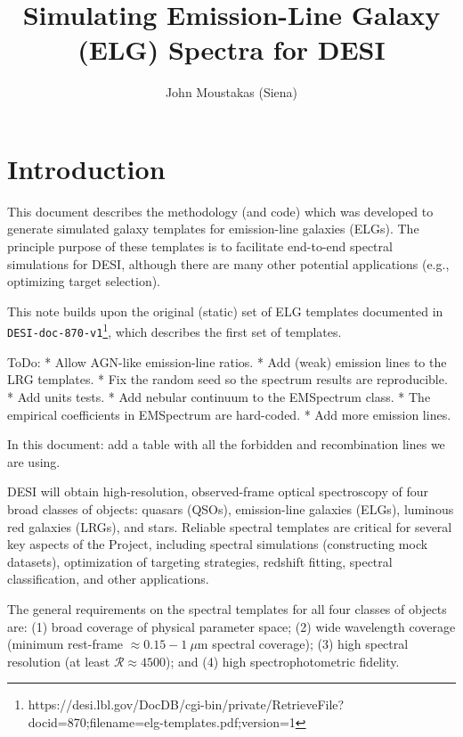 \documentclass[12pt]{article}
\begin{document}
\title{
  Simulating Emission-Line Galaxy (ELG) Spectra for DESI 
}

\author{John Moustakas (Siena)}
\maketitle


\section{Introduction}

This document describes the methodology (and code) which was developed
to generate simulated galaxy templates for emission-line galaxies
(ELGs).  The principle purpose of these templates is to facilitate
end-to-end spectral simulations for DESI, although there are many
other potential applications (e.g., optimizing target selection).

This note builds upon the original (static) set of ELG templates
documented in {\tt
  DESI-doc-870-v1}\footnote{https://desi.lbl.gov/DocDB/cgi-bin/private/RetrieveFile?docid=870;filename=elg-templates.pdf;version=1},
which describes the first set of templates.

ToDo:
* Allow AGN-like emission-line ratios.
* Add (weak) emission lines to the LRG templates.
* Fix the random seed so the spectrum results are reproducible.
* Add units tests.
* Add nebular continuum to the EMSpectrum class.
* The empirical coefficients in EMSpectrum are hard-coded.
* Add more emission lines.

In this document: add a table with all the forbidden and recombination lines we
are using.

DESI will obtain high-resolution, observed-frame optical spectroscopy
of four broad classes of objects: quasars (QSOs), emission-line
galaxies (ELGs), luminous red galaxies (LRGs), and stars.  Reliable
spectral templates are critical for several key aspects of the
Project, including spectral simulations (constructing mock datasets),
optimization of targeting strategies, redshift fitting, spectral
classification, and other applications.

The general requirements on the spectral templates for all four
classes of objects are: (1) broad coverage of physical parameter
space; (2) wide wavelength coverage (minimum rest-frame
$\approx0.15-1~\mu$m spectral coverage); (3) high spectral
resolution (at least $\mathcal{R}\approx4500$); and (4) high
spectrophotometric fidelity.  
\end{document}
